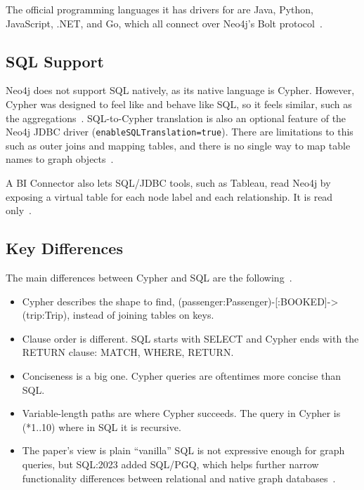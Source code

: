 \documentclass[10pt,a4paper,twocolumn]{article}
\begin{document}
The official programming languages it has drivers for are Java, Python, JavaScript, .NET, and Go, which all connect over Neo4j's Bolt protocol~\cite{neo4j2026drivers}.

\subsection{SQL Support}

Neo4j does not support SQL natively, as its native language is Cypher. However, Cypher was designed to feel like and behave like SQL, so it feels similar, such as the aggregations~\cite{neo4j2026cypher}. SQL-to-Cypher translation is also an optional feature of the Neo4j JDBC driver (\texttt{enableSQL\-Translation=true}). There are limitations to this such as outer joins and mapping tables, and there is no single way to map table names to graph objects~\cite{neo4j2026sql2cypher}.

A BI Connector also lets SQL/JDBC tools, such as Tableau, read Neo4j by exposing a virtual table for each node label and each relationship. It is read only~\cite{allen2020biconnector}.

\subsection{Key Differences}

The main differences between Cypher and SQL are the following~\cite{neo4j2026cypher}.

\begin{itemize}
  \item Cypher describes the shape to find, (passenger:Passenger)-[:BOOKED]->(trip:Trip), instead of joining tables on keys.
  \item Clause order is different. SQL starts with SELECT and Cypher ends with the RETURN clause: MATCH, WHERE, RETURN.
  \item Conciseness is a big one. Cypher queries are oftentimes more concise than SQL.
  \item Variable-length paths are where Cypher succeeds. The query in Cypher is (*1..10) where in SQL it is recursive.
  \item The paper's view is plain ``vanilla'' SQL is not expressive enough for graph queries, but SQL:2023 added SQL/PGQ, which helps further narrow functionality differences between relational and native graph databases~\cite{stonebraker2024whatgoesaround}.
\end{itemize}
\end{document}
